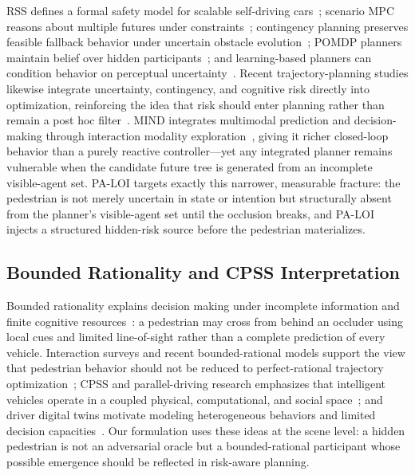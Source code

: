 \documentclass[journal]{IEEEtran}
\begin{document}
RSS defines a formal safety model for scalable self-driving cars~\cite{shalev2017rss}; scenario MPC reasons about multiple futures under constraints~\cite{cesari2017mpc}; contingency planning preserves feasible fallback behavior under uncertain obstacle evolution~\cite{hardy2013contingency,li2023marc}; POMDP planners maintain belief over hidden participants~\cite{zhang2021pomdp}; and learning-based planners can condition behavior on perceptual uncertainty~\cite{packer2023anyone}. Recent trajectory-planning studies likewise integrate uncertainty, contingency, and cognitive risk directly into optimization, reinforcing the idea that risk should enter planning rather than remain a post hoc filter~\cite{guo2025uncertainty,lin2025contingency,zhao2026cognitive}. MIND integrates multimodal prediction and decision-making through interaction modality exploration~\cite{mind2025}, giving it richer closed-loop behavior than a purely reactive controller---yet any integrated planner remains vulnerable when the candidate future tree is generated from an incomplete visible-agent set. PA-LOI targets exactly this narrower, measurable fracture: the pedestrian is not merely uncertain in state or intention but structurally absent from the planner's visible-agent set until the occlusion breaks, and PA-LOI injects a structured hidden-risk source before the pedestrian materializes.

\subsection{Bounded Rationality and CPSS Interpretation}

Bounded rationality explains decision making under incomplete information and finite cognitive resources~\cite{simon1955behavioral}: a pedestrian may cross from behind an occluder using local cues and limited line-of-sight rather than a complete prediction of every vehicle. Interaction surveys and recent bounded-rational models support the view that pedestrian behavior should not be reduced to perfect-rational trajectory optimization~\cite{rasouli2020survey,dang2025bounded}; CPSS and parallel-driving research emphasizes that intelligent vehicles operate in a coupled physical, computational, and social space~\cite{wang2010parallel,wang2017parallel,wang2024parallel}; and driver digital twins motivate modeling heterogeneous behaviors and limited decision capacities~\cite{hu2022driver}. Our formulation uses these ideas at the scene level: a hidden pedestrian is not an adversarial oracle but a bounded-rational participant whose possible emergence should be reflected in risk-aware planning.
\end{document}
